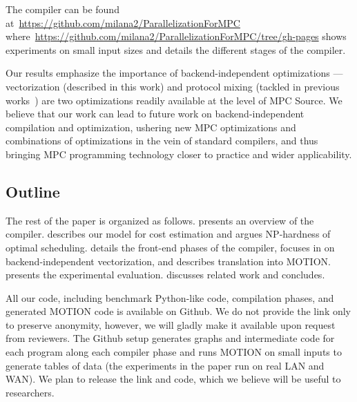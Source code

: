 The compiler can be found at~\url{https://github.com/milana2/ParallelizationForMPC} where~\url{https://github.com/milana2/ParallelizationForMPC/tree/gh-pages} shows experiments on small input sizes and details the different stages of the compiler. 

Our results emphasize the importance of backend-independent optimizations --- vectorization (described in this work) and protocol mixing (tackled in previous works~\cite{Buscher:2018b,Ishaq:2019, Fang:2022}) are two optimizations readily available at the level of MPC Source. We believe that our work can lead to future work on backend-independent compilation and optimization, ushering new MPC optimizations and combinations of optimizations in the vein of standard compilers, and thus bringing MPC programming technology closer to practice and wider applicability.

\subsection{Outline}

The rest of the paper is organized as follows.  presents an overview of the compiler.  describes our model for cost estimation and argues NP-hardness of optimal scheduling.  details the front-end phases of the compiler,  focuses in on backend-independent vectorization, and  describes translation into MOTION.  presents the experimental evaluation. discusses related work and  concludes.

All our code, including benchmark Python-like code, compilation phases, and generated MOTION code is available on Github. We do not provide the link only to preserve anonymity, 
however, we will gladly make it available upon request from reviewers. The Github setup generates graphs and intermediate code for each program along each compiler phase and runs MOTION on 
small inputs to generate tables of data (the experiments in the paper run on real LAN and WAN). We plan to release the link and code, which we believe will be useful to researchers.


